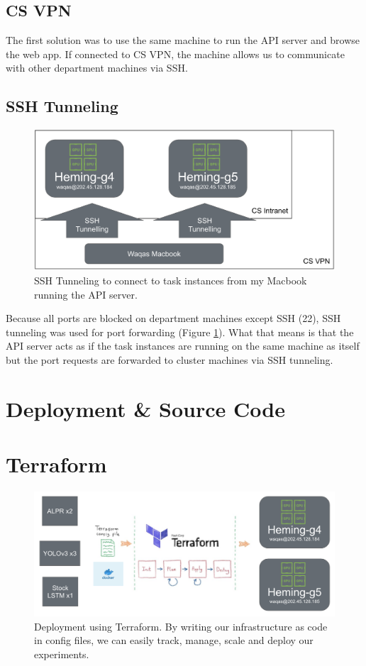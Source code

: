 \documentclass{report}
\begin{document}
\subsection{CS VPN}

The first solution was to use the same machine to run the API server and browse the web app.
If connected to CS VPN, the machine allows us to communicate with other department machines via SSH.

\subsection{SSH Tunneling}

\begin{figure}[h!]
  \includegraphics[width=\textwidth]{sshtunneling.png}
  \caption{SSH Tunneling to connect to task instances from my Macbook running the API server.}
  \label{fig:sshtunneling}
\end{figure}

Because all ports are blocked on department machines except SSH (22), SSH tunneling was used for port forwarding (Figure \ref{fig:sshtunneling}).
What that means is that the API server acts as if the task instances are running on the same machine as itself but the port requests are forwarded to cluster machines via SSH tunneling.

\section{Deployment \& Source Code}

\section{Terraform}

\begin{figure}[h!]
  \includegraphics[width=\textwidth]{terraform.png}
  \caption{Deployment using Terraform. By writing our infrastructure as code in config files, we can easily track, manage, scale and deploy our experiments.}
  \label{fig:Terraform}
\end{figure}
\end{document}
